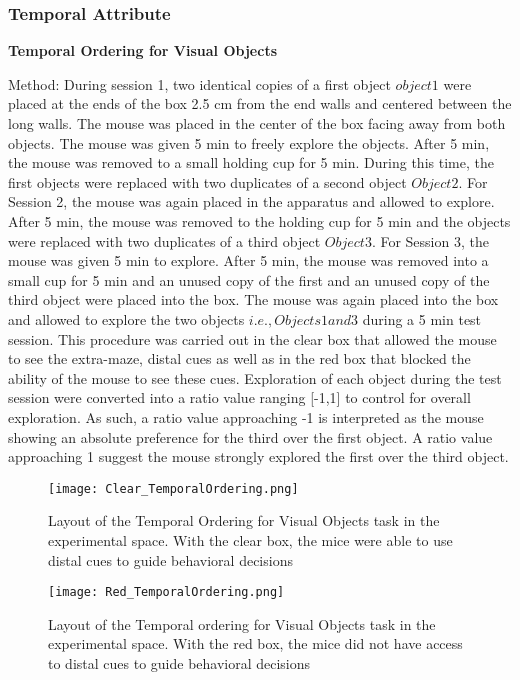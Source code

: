 \documentclass{article}
\begin{document}
\subsubsection{Temporal Attribute}
\textbf{Temporal Ordering for Visual Objects}

Method:
During session 1, two identical copies of a first object \(object 1\) were placed at the ends of the box 2.5 cm from the end walls and centered between the long walls. The mouse was placed in the center of the box facing away from both objects. The mouse was given 5 min to freely explore the objects. After 5 min, the mouse was removed to a small holding cup for 5 min. During this time, the first objects were replaced with two duplicates of a second object \(Object 2\). For Session 2, the mouse was again placed in the apparatus and allowed to explore. After 5 min, the mouse was removed to the holding cup for 5 min and the objects were replaced with two duplicates of a third object \(Object 3\). For Session 3, the mouse was given 5 min to explore. After 5 min, the mouse was removed into a small cup for 5 min and an unused copy of the first and an unused copy of the third object were placed into the box. The mouse was again placed into the box and allowed to explore the two objects \(i.e., Objects 1 and 3\) during a 5 min test session. This procedure was carried out in the clear box that allowed the mouse to see the extra-maze, distal cues as well as in the red box that blocked the ability of the mouse to see these cues. Exploration of each object during the test session were converted into a ratio value ranging [-1,1] to control for overall exploration. As such, a ratio value approaching -1 is interpreted as the mouse showing an absolute preference for the third over the first object. A ratio value approaching 1 suggest the mouse strongly explored the first over the third object.

\begin{figure}[h!]
\centering
\texttt{[image: Clear\_TemporalOrdering.png]}
\caption{Layout of the Temporal Ordering for Visual Objects task in the experimental space. With the clear box, the mice were able to use distal cues to guide behavioral decisions}
\label{fig:Temporal Ordering}
\end{figure}

\begin{figure}[h!]
\centering
\texttt{[image: Red\_TemporalOrdering.png]}
\caption{Layout of the Temporal ordering for Visual Objects task in the experimental space. With the red box, the mice did not have access to distal cues to guide behavioral decisions}
\label{fig:Temporal Ordering}
\end{figure}
\end{document}
